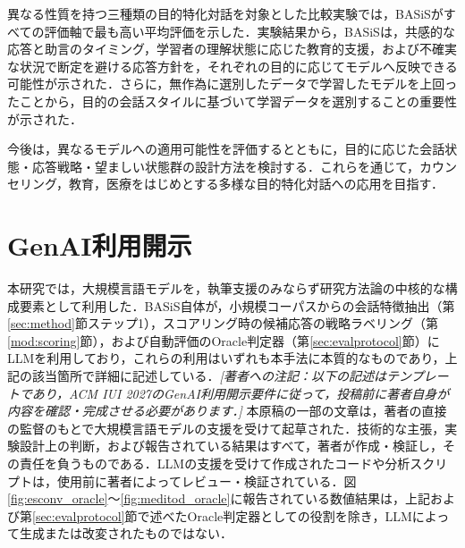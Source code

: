 \documentclass[manuscript,review,anonymous]{acmart}
\begin{document}
異なる性質を持つ三種類の目的特化対話を対象とした比較実験では，BASiSがすべての評価軸で最も高い平均評価を示した．実験結果から，BASiSは，共感的な応答と助言のタイミング，学習者の理解状態に応じた教育的支援，および不確実な状況で断定を避ける応答方針を，それぞれの目的に応じてモデルへ反映できる可能性が示された．さらに，無作為に選別したデータで学習したモデルを上回ったことから，目的の会話スタイルに基づいて学習データを選別することの重要性が示された．

今後は，異なるモデルへの適用可能性を評価するとともに，目的に応じた会話状態・応答戦略・望ましい状態群の設計方法を検討する．これらを通じて，カウンセリング，教育，医療をはじめとする多様な目的特化対話への応用を目指す．

\section*{GenAI利用開示}
本研究では，大規模言語モデルを，執筆支援のみならず研究方法論の中核的な構成要素として利用した．BASiS自体が，小規模コーパスからの会話特徴抽出（第\ref{sec:method}節ステップ1），スコアリング時の候補応答の戦略ラベリング（第\ref{mod:scoring}節），および自動評価のOracle判定器（第\ref{sec:evalprotocol}節）にLLMを利用しており，これらの利用はいずれも本手法に本質的なものであり，上記の該当箇所で詳細に記述している．\emph{[著者への注記：以下の記述はテンプレートであり，ACM IUI 2027のGenAI利用開示要件に従って，投稿前に著者自身が内容を確認・完成させる必要があります．]} 本原稿の一部の文章は，著者の直接の監督のもとで大規模言語モデルの支援を受けて起草された．技術的な主張，実験設計上の判断，および報告されている結果はすべて，著者が作成・検証し，その責任を負うものである．LLMの支援を受けて作成されたコードや分析スクリプトは，使用前に著者によってレビュー・検証されている．図\ref{fig:esconv_oracle}〜\ref{fig:meditod_oracle}に報告されている数値結果は，上記および第\ref{sec:evalprotocol}節で述べたOracle判定器としての役割を除き，LLMによって生成または改変されたものではない．



\end{document}
